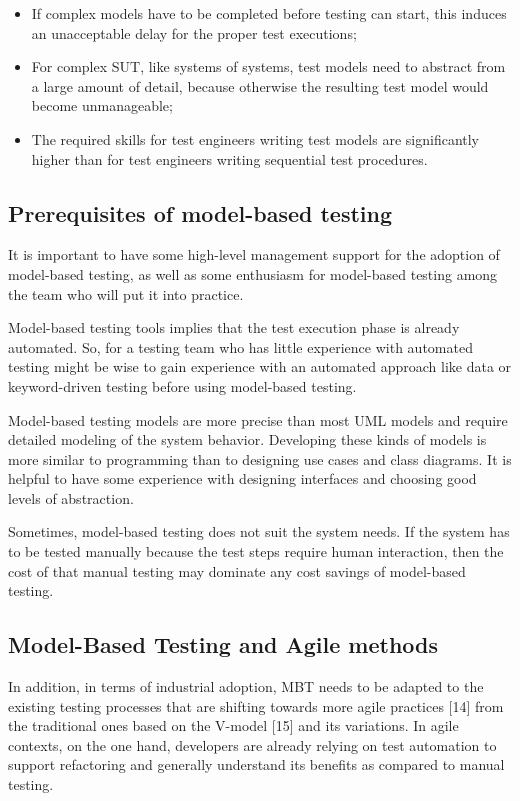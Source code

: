\begin{itemize}
\item If complex models have to be completed before testing
can start, this induces an unacceptable delay for the
proper test executions;
\item For complex SUT, like systems of systems, test models 
need to abstract from a large amount of detail, because 
otherwise the resulting test model would become unmanageable;
\item The required skills for test engineers writing test 
models are significantly higher than for test engineers 
writing sequential test procedures.
\end{itemize}

\subsection{Prerequisites of model-based testing}

It is important to have some high-level management support for the adoption of model-based testing, as well as some enthusiasm for model-based testing among the team who will put it into practice.

Model-based testing tools implies that the test execution phase is already automated. So, for a testing team who has little experience with automated testing might be wise to gain experience with an automated approach like data or keyword-driven testing before using model-based testing.

Model-based testing models are more precise than most UML models and require detailed modeling of the system behavior. Developing these kinds of models is more similar to programming than to designing use cases and class diagrams. It is helpful to have some experience with designing interfaces and choosing good levels of abstraction.

Sometimes, model-based testing does not suit the system needs. If the system has to be tested manually because the test steps require human interaction, then the cost of that manual testing may dominate any cost savings of model-based testing.

\subsection{Model-Based Testing and Agile methods}

In addition, in terms of industrial adoption, MBT needs to be adapted to the existing testing processes that are shifting towards more agile practices [14] from the traditional ones based on the V-model [15] and its variations. In agile contexts, on the one hand, developers are already relying on test automation to support refactoring and generally understand its benefits as compared to manual testing. 

